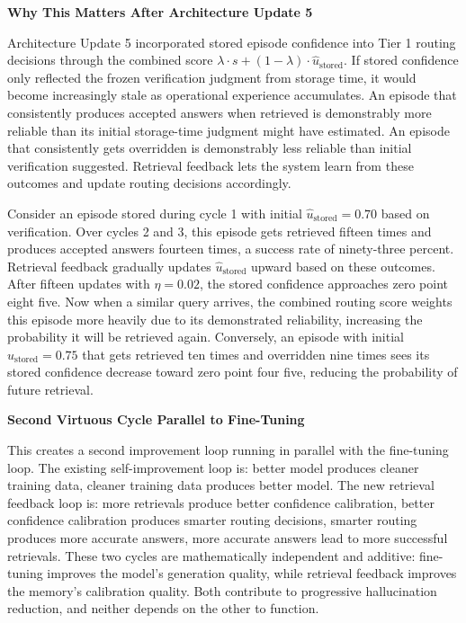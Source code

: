 \documentclass[11pt,a4paper]{article}
\newcommand{\ustored}{\hat{u}_{\text{stored}}}
\begin{document}
{\textbf{Why This Matters After Architecture Update 5}

Architecture Update 5 incorporated stored episode confidence into Tier 1 routing decisions through the combined score $\lambda \cdot s + (1-\lambda) \cdot \ustored$. If stored confidence only reflected the frozen verification judgment from storage time, it would become increasingly stale as operational experience accumulates. An episode that consistently produces accepted answers when retrieved is demonstrably more reliable than its initial storage-time judgment might have estimated. An episode that consistently gets overridden is demonstrably less reliable than initial verification suggested. Retrieval feedback lets the system learn from these outcomes and update routing decisions accordingly.

Consider an episode stored during cycle 1 with initial $\ustored = 0.70$ based on verification. Over cycles 2 and 3, this episode gets retrieved fifteen times and produces accepted answers fourteen times, a success rate of ninety-three percent. Retrieval feedback gradually updates $\ustored$ upward based on these outcomes. After fifteen updates with $\eta = 0.02$, the stored confidence approaches zero point eight five. Now when a similar query arrives, the combined routing score weights this episode more heavily due to its demonstrated reliability, increasing the probability it will be retrieved again. Conversely, an episode with initial $\ustored = 0.75$ that gets retrieved ten times and overridden nine times sees its stored confidence decrease toward zero point four five, reducing the probability of future retrieval.

\textbf{Second Virtuous Cycle Parallel to Fine-Tuning}

This creates a second improvement loop running in parallel with the fine-tuning loop. The existing self-improvement loop is: better model produces cleaner training data, cleaner training data produces better model. The new retrieval feedback loop is: more retrievals produce better confidence calibration, better confidence calibration produces smarter routing decisions, smarter routing produces more accurate answers, more accurate answers lead to more successful retrievals. These two cycles are mathematically independent and additive: fine-tuning improves the model's generation quality, while retrieval feedback improves the memory's calibration quality. Both contribute to progressive hallucination reduction, and neither depends on the other to function.

}
\end{document}
